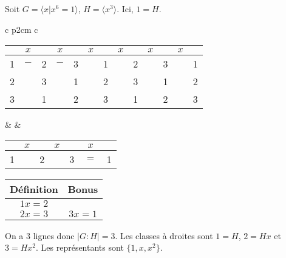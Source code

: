      \begin{ex}
       Soit $G = \langle x | x^6 = 1 \rangle$, $H = \langle x^3 \rangle$. Ici, $1 = H$.
       \begin{center}
         \begin{tabular}{c p{2cm} c}
           \begin{tabular}{|ccccccccccccc|}
             \hline
             & $x$ & & $x$ & & $x$ & & $x$ & & $x$ & & $x$ & \\
             \hline
             1 & $-$ & 2 & $-$ & 3 & & 1 & & 2 & & 3 & & 1\\
             \hline
             2 & & 3 & & 1 & & 2 & & 3 & & 1 & & 2\\
             \hline
             3 & & 1 & & 2 & & 3 & & 1 & & 2 & & 3 \\
             \hline
           \end{tabular}
               & &
                   \begin{tabular}{|ccccccc|}
                     \hline
                     & $x$ & & $x$ & & $x$ & \\
                     \hline
                     1 & & 2 & & 3 & $=$ & 1\\
                     \hline
                   \end{tabular}
         \end{tabular}
       \end{center}
       
       \begin{center}
         \begin{tabular}{|c|c|}
           \hline
           Définition & Bonus \\
           \hline
           $1x = 2$ & \\

           $2x = 3$ &  $3x = 1$\\
           \hline
         \end{tabular}
       \end{center}

       
       On a 3 lignes donc $|G:H| = 3$. Les classes à droites sont $1 = H$, $2 = Hx$ et $3 = Hx^2$. Les
       représentants sont $\{1, x, x^2\}$.
     \end{ex}



